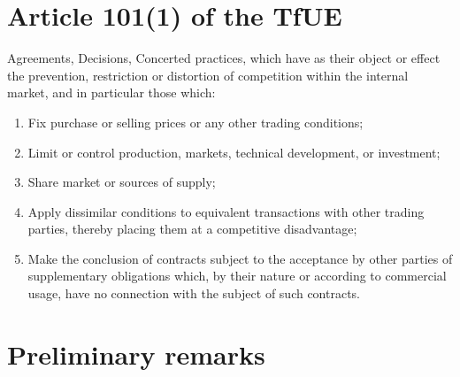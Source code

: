 \section*{Article 101(1) of the TfUE}

    Agreements, Decisions, Concerted practices, which have as their object or effect the prevention, restriction or distortion of competition within the internal market, and in particular those which:

        \begin{enumerate}
            \item Fix purchase or selling prices or any other trading conditions;
            \item Limit or control production, markets, technical development, or investment;
            \item Share market or sources of supply;
            \item Apply dissimilar conditions to equivalent transactions with other trading parties, thereby placing them at a competitive disadvantage;
            \item Make the conclusion of contracts subject to the acceptance by other parties of supplementary obligations which, by their nature or according to commercial usage, have no connection with the subject of such contracts.
        \end{enumerate}


\section{Preliminary remarks}

